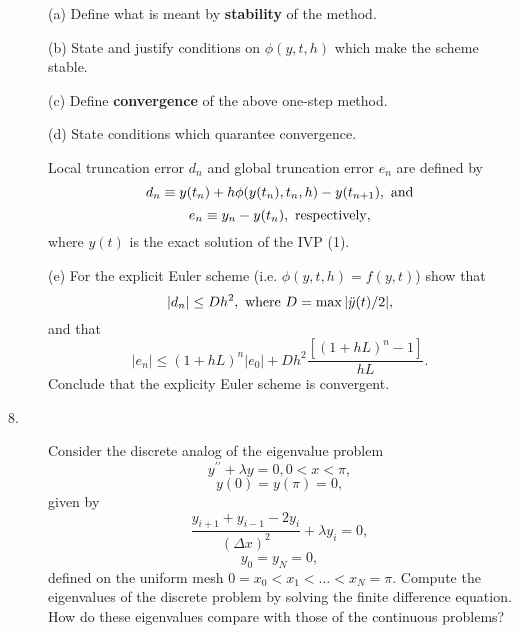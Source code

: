 \documentclass{article}
\begin{document}
\begin{description}
\item[\quad] (a)
Define what is meant by {\bf stability} of the method.

\item[\quad] (b)
State and justify conditions on $\phi(y, t, h)$ which make the scheme stable.

\item[\quad] (c)
Define {\bf convergence} of the above one-step method.

\item[\quad] (d)
State conditions which quarantee convergence.

Local truncation error $d_n$ and global truncation error $e_n$ are defined by
$$d_n \equiv y(t_n) + h \phi (y(t_n), t_n, h) - y(t_{n+1}), \hbox{\ and}$$
$$e_n \equiv y_n - y(t_n), \hbox{\ respectively},$$
where $y(t)$ is the exact solution of the IVP (1).

\item[\quad] (e)
For the explicit Euler scheme (i.e. $\phi (y, t, h) = f(y,t)$) show that
$$|d_n| \leq Dh^2, \hbox{\ where\ } D = \max |\ddot y (t) / 2|,$$
and that
$$|e_n| \leq (1 + hL)^n |e_0| + Dh^2 \frac{[(1+hL)^n-1]}{hL}.$$
Conclude that the explicity Euler scheme is convergent.

\item[8.]
Consider the discrete analog of the eigenvalue problem
$$y^{\prime \prime} + \lambda y = 0, 0 < x < \pi,$$
$$y(0) = y(\pi) = 0,$$
given by
$$\frac{y_{i+1} + y_{i-1} - 2y_i}{(\Delta x)^2} + \lambda y_i = 0,$$
$$y_0 = y_N = 0,$$
defined on the uniform mesh $0 = x_0 < x_1 < \dots < x_N = \pi$. Compute
the eigenvalues of the discrete problem by solving the finite difference
equation. How do these eigenvalues compare with those of the continuous
problems?



\end{description}    
\end{document}
